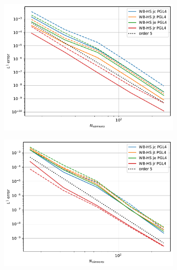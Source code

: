 \documentclass[pt12]{beamer}
\begin{document}
\begin{frame}[label=NumericalResultsWithoutWBmonodimensionalcasesSW]
\begin{figure}
        \label{convergence}
\end{figure}
\begin{figure}
     \centering
     \begin{subfigure}[b]{0.30\textwidth}
         \centering
         \includegraphics[width=\textwidth]{alb_sub_convergenceWB-HS.pdf}
         \label{convergence_comp_jumps_sub}
     \end{subfigure}
     \begin{subfigure}[b]{0.30\textwidth}
         \centering
         \includegraphics[width=\textwidth]{alb_trans_convergenceWB-HS.pdf}
         \label{convergence_comp_jumps_trans}
     \end{subfigure}

\end{figure}
\end{frame}
\end{document}

